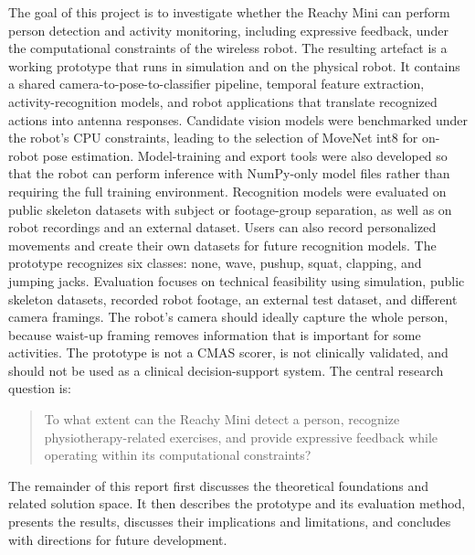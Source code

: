 The goal of this project is to investigate whether the Reachy Mini can perform
person detection and activity monitoring, including expressive feedback, under
the computational constraints of the wireless robot. The resulting artefact is
a working prototype that runs in simulation and on the physical robot. It
contains a shared camera-to-pose-to-classifier pipeline, temporal feature
extraction, activity-recognition models, and robot applications that translate
recognized actions into antenna responses. Candidate vision models were
benchmarked under the robot's CPU constraints, leading to the selection of
MoveNet int8 for on-robot pose estimation. Model-training and export tools were
also developed so that the robot can perform inference with NumPy-only model
files rather than requiring the full training environment. Recognition models
were evaluated on public skeleton datasets with subject or footage-group
separation, as well as on robot recordings and an external dataset. Users can
also record personalized movements and create their own datasets for future
recognition models.
The prototype recognizes six classes: none, wave, pushup, squat, clapping,
and jumping jacks. Evaluation focuses on technical feasibility using
simulation, public skeleton datasets, recorded robot footage, an external test
dataset, and different camera framings. The robot's camera should ideally
capture the whole person, because waist-up framing removes information that is
important for some activities.
The prototype is not a CMAS scorer, is not clinically validated, and should
not be used as a clinical decision-support system.
The central research question is:
\begin{quote}
To what extent can the Reachy Mini detect a person, recognize physiotherapy-related exercises, and provide expressive feedback while operating within its computational constraints? 
\end{quote}
The remainder of this report first discusses the theoretical foundations and
related solution space. It then describes the prototype and its evaluation
method, presents the results, discusses their implications and limitations,
and concludes with directions for future development.

\newpage
